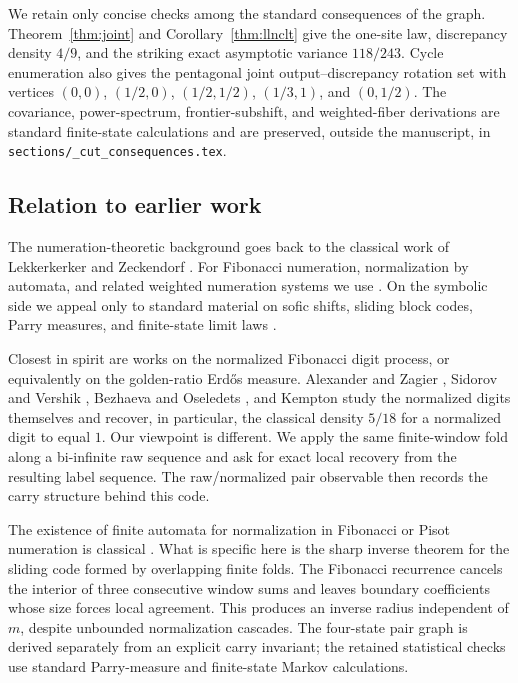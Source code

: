 We retain only concise checks among the standard consequences of the graph. Theorem~\ref{thm:joint} and Corollary~\ref{thm:llnclt} give the one-site law, discrepancy density \(4/9\), and the striking exact asymptotic variance \(118/243\). Cycle enumeration also gives the pentagonal joint output--discrepancy rotation set with vertices \((0,0)\), \((1/2,0)\), \((1/2,1/2)\), \((1/3,1)\), and \((0,1/2)\). The covariance, power-spectrum, frontier-subshift, and weighted-fiber derivations are standard finite-state calculations and are preserved, outside the manuscript, in \texttt{sections/\_cut\_consequences.tex}.

\subsection{Relation to earlier work}

The numeration-theoretic background goes back to the classical work of Lekkerkerker and Zeckendorf \cite{Lekkerkerker1952,Zeckendorf1972}. For Fibonacci numeration, normalization by automata, and related weighted numeration systems we use \cite{Brown1964,Fraenkel1985,Frougny1988,Frougny1992,FrougnyConfluent1992,FrougnySolomyak1996,FrougnySakarovitch1998,AlloucheShallit2003,GrabnerKirschenhoferTichy2002,DumontSidorovThomas1999,ShallitShan2023}. On the symbolic side we appeal only to standard material on sofic shifts, sliding block codes, Parry measures, and finite-state limit laws \cite{Weiss1973,LindMarcus1995,Kitchens1998,Parry1964,ParryPollicott1990}.

Closest in spirit are works on the normalized Fibonacci digit process, or equivalently on the golden-ratio Erd\H{o}s measure. Alexander and Zagier \cite{AlexanderZagier1991}, Sidorov and Vershik \cite{SidorovVershik1998}, Bezhaeva and Oseledets \cite{BezhaevaOseledets2007,BezhaevaOseledets2010,BezhaevaOseledets2Step}, and Kempton \cite{KemptonDigits2014} study the normalized digits themselves and recover, in particular, the classical density \(5/18\) for a normalized digit to equal \(1\). Our viewpoint is different. We apply the same finite-window fold along a bi-infinite raw sequence and ask for exact local recovery from the resulting label sequence. The raw/normalized pair observable then records the carry structure behind this code.

The existence of finite automata for normalization in Fibonacci or Pisot numeration is classical \cite{Frougny1988,Frougny1992,FrougnyConfluent1992,FrougnySolomyak1996,FrougnySakarovitch1998}. What is specific here is the sharp inverse theorem for the sliding code formed by overlapping finite folds. The Fibonacci recurrence cancels the interior of three consecutive window sums and leaves boundary coefficients whose size forces local agreement. This produces an inverse radius independent of \(m\), despite unbounded normalization cascades. The four-state pair graph is derived separately from an explicit carry invariant; the retained statistical checks use standard Parry-measure and finite-state Markov calculations.

